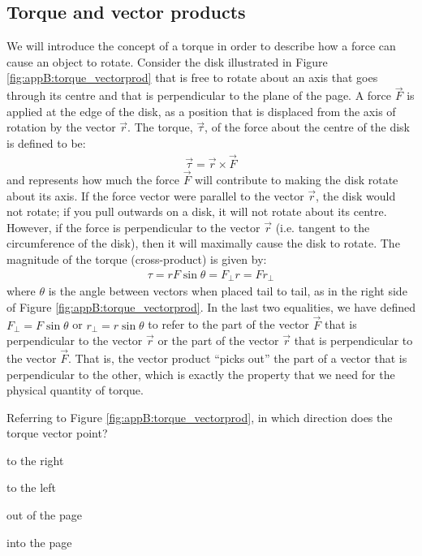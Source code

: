 \subsection{Torque and vector products}
We will introduce the concept of a torque in order to describe how a force can cause an object to rotate. Consider the disk illustrated in Figure \ref{fig:appB:torque_vectorprod} that is free to rotate about an axis that goes through its centre and that is perpendicular to the plane of the page. A force $\vec F$ is applied at the edge of the disk, as a position that is displaced from the axis of rotation by the vector $\vec r$. The torque, $\vec \tau$, of the force about the centre of the disk is defined to be:
\begin{align*}
\vec\tau=\vec r\times \vec F
\end{align*}
and represents how much the force $\vec F$ will contribute to making the disk rotate about its axis. If the force vector were parallel to the vector $\vec r$, the disk would not rotate; if you pull outwards on a disk, it will not rotate about its centre. However, if the force is perpendicular to the vector $\vec r$ (i.e. tangent to the circumference of the disk), then it will maximally cause the disk to rotate. The magnitude of the torque (cross-product) is given by:
\begin{align*}
\tau =rF\sin\theta=F_{\perp}r=Fr_\perp
\end{align*}
where $\theta$ is the angle between vectors when placed tail to tail, as in the right side of Figure \ref{fig:appB:torque_vectorprod}. In the last two equalities, we have defined $F_\perp=F\sin\theta$ or $r_\perp=r\sin\theta$ to refer to the part of the vector $\vec F$ that is perpendicular to the vector $\vec r$ or the part of the vector $\vec r$ that is perpendicular to the vector $\vec F$. That is, the vector product ``picks out'' the part of a vector that is perpendicular to the other, which is exactly the property that we need for the physical quantity of torque.


\begin{checkpointMC}{Referring to Figure \ref{fig:appB:torque_vectorprod}, in which direction does the torque vector point?}
\item to the right
\item to the left
\item out of the page %
\item into the page
\end{checkpointMC}